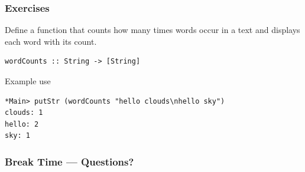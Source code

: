 \documentclass{beamer}
\begin{document}
\begin{frame}[fragile]
  \frametitle{Exercises}
  Define a function that counts how many times words occur in a text and displays each word with its count.
\begin{verbatim}
wordCounts :: String -> [String]
\end{verbatim}
  Example use
\begin{verbatim}
*Main> putStr (wordCounts "hello clouds\nhello sky")
clouds: 1
hello: 2
sky: 1
\end{verbatim}
\end{frame}

\begin{frame}
  \frametitle{Break Time --- Questions?}
  \begin{center}
  \end{center}
\end{frame}
\end{document}
